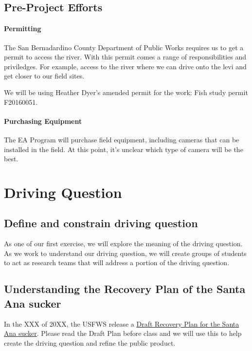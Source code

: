 \documentclass{tufte-handout}\usepackage[]{graphicx}\usepackage[]{color}
\begin{document}
\subsection{Pre-Project Efforts}

\paragraph{Permitting} The San Bernadardino County Department of Public Works requires us to get a permit to access the river. With this permit comes a range of responsibilities and priviledges. For example, access to the river where we can drive onto the levi and get closer to our field sites. 

We will be using Heather Dyer's amended permit for the work: Fish study permit F20160051.

\paragraph{Purchasing Equipment} The EA Program will purchase field equipment, including cameras that can be installed in the field. At this point, it's unclear which type of camera will be the best.


\section{Driving Question}

\subsection{Define and constrain driving question}

As one of our first exercise, we will explore the meaning of the driving question. As we work to understand our driving question, we will create groups of students to act as research teams that will address a portion of the driving question.

\subsection{Understanding the Recovery Plan of the Santa Ana sucker}

In the XXX of 20XX, the USFWS release a \href{https://www.fws.gov/carlsbad/SpeciesStatusList/RP/201411xx_Draft%20RP_SASU.pdf}{Draft Recovery Plan for the Santa Ana sucker}. Please read the Draft Plan before class and we will use this to help create the driving question and refine the public product. 
\end{document}
